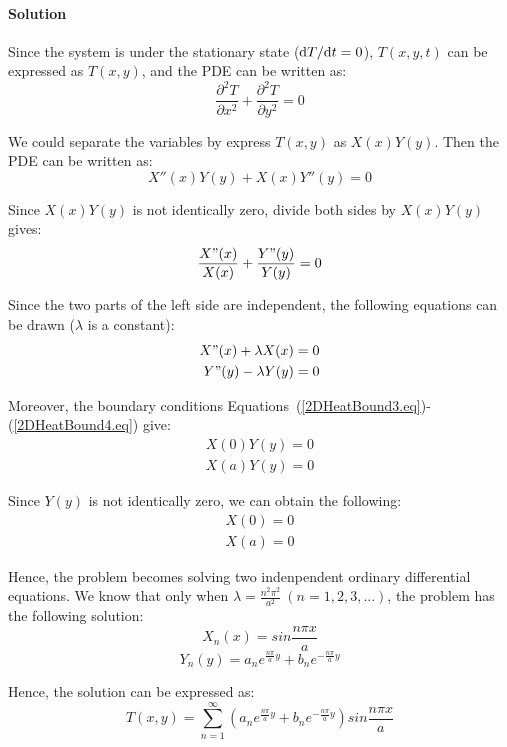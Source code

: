 \paragraph{Solution}
Since the system is under the stationary state ($\mathrm d T/\mathrm d t=0$), $T(x,y,t)$ can be expressed as $T(x,y)$, and the PDE can be written as:
\begin{equation}
\frac{\partial^2T}{\partial x^2}+\frac{\partial^2T}{\partial y^2}=0
\end{equation}

We could separate the variables by express $T(x,y)$ as $X(x)Y(y)$. Then the PDE can be written as:
\begin{equation}
X''(x)Y(y)+X(x)Y''(y)=0
\end{equation}

Since $X(x)Y(y)$ is not identically zero, divide both sides by $X(x)Y(y)$ gives:
\begin{equation}
\frac{X"(x)}{X(x)}+\frac{Y"(y)}{Y(y)}=0
\end{equation}

Since the two parts of the left side are independent, the following equations can be drawn ($\lambda$ is a constant):
\begin{align}
X"(x)+\lambda X(x)=0\\
Y"(y)-\lambda Y(y)=0
\end{align}

Moreover, the boundary conditions Equations~(\ref{2DHeatBound3.eq})-(\ref{2DHeatBound4.eq}) give:
\begin{align}
X(0)Y(y)=0\\
X(a)Y(y)=0
\end{align}

Since $Y(y)$ is not identically zero, we can obtain the following:
\begin{align}
X(0)=0\\
X(a)=0
\end{align}

Hence, the problem becomes solving two indenpendent ordinary differential equations. We know that only when $\lambda=\frac{n^2\pi^2}{a^2}\ (n=1,2,3,...)$, the problem has the following solution:
\begin{equation}
X_n(x)=sin\frac{n\pi x}{a}
\end{equation}
\begin{equation}
Y_n(y)=a_ne^{\frac{n\pi}{a}y}+b_ne^{-\frac{n\pi}{a}y}
\end{equation}

Hence, the solution can be expressed as:
\begin{equation}
T(x,y)=\sum_{n=1}^{\infty}(a_ne^{\frac{n\pi}{a}y}+b_ne^{-\frac{n\pi}{a}y})sin\frac{n\pi x}{a}
\end{equation}

